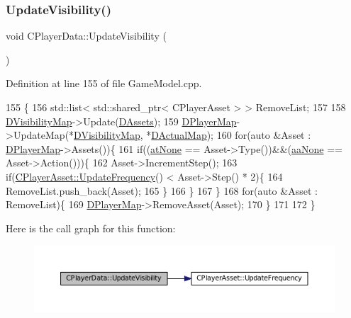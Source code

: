 \subsubsection{\texorpdfstring{Update\+Visibility()}{UpdateVisibility()}}
{\footnotesize\ttfamily void C\+Player\+Data\+::\+Update\+Visibility (\begin{DoxyParamCaption}{ }\end{DoxyParamCaption})}



Definition at line 155 of file Game\+Model.\+cpp.


\begin{DoxyCode}
155                                   \{
156     std::list< std::shared\_ptr< CPlayerAsset > > RemoveList;
157     
158     \hyperlink{classCPlayerData_a804ea65e7ec7c90b2e335414d106cc78}{DVisibilityMap}->Update(\hyperlink{classCPlayerData_a1d7dd355facf52db6242e3554373906c}{DAssets});
159     \hyperlink{classCPlayerData_a452163191cd4603e1e38dd8d4bb9691c}{DPlayerMap}->UpdateMap(*\hyperlink{classCPlayerData_a804ea65e7ec7c90b2e335414d106cc78}{DVisibilityMap}, *\hyperlink{classCPlayerData_a943801106af1d7ad52abd73d32552186}{DActualMap});
160     \textcolor{keywordflow}{for}(\textcolor{keyword}{auto} &Asset : \hyperlink{classCPlayerData_a452163191cd4603e1e38dd8d4bb9691c}{DPlayerMap}->Assets())\{
161         \textcolor{keywordflow}{if}((\hyperlink{GameDataTypes_8h_a5600d4fc433b83300308921974477feca82fb51718e2c00981a2d37bc6fe92593}{atNone} == Asset->Type())&&(\hyperlink{GameDataTypes_8h_ab47668e651a3032cfb9c40ea2d60d670ac17cc5a0035320c060d7f8074143b507}{aaNone} == Asset->Action()))\{
162             Asset->IncrementStep();
163             \textcolor{keywordflow}{if}(\hyperlink{classCPlayerAsset_a0aff85b9552967a42f4f3f42cb59c19f}{CPlayerAsset::UpdateFrequency}() < Asset->Step() * 2)\{
164                 RemoveList.push\_back(Asset);   
165             \}
166         \}
167     \}
168     \textcolor{keywordflow}{for}(\textcolor{keyword}{auto} &Asset : RemoveList)\{
169         \hyperlink{classCPlayerData_a452163191cd4603e1e38dd8d4bb9691c}{DPlayerMap}->RemoveAsset(Asset);     
170     \}
171     
172 \}
\end{DoxyCode}
Here is the call graph for this function\+:\nopagebreak
\begin{figure}[H]
\begin{center}
\leavevmode
\includegraphics[width=350pt]{classCPlayerData_a3ac1393306e8a3f7c95d13ca01e429a7_cgraph}
\end{center}
\end{figure}
